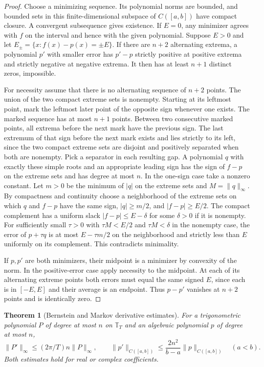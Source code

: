 \documentclass[11pt,oneside,openany]{book}
\newtheorem{theorem}{Theorem}[chapter]
\theoremstyle{definition}
\theoremstyle{remark}
\begin{document}
\begin{proof}
Choose a minimizing sequence. Its polynomial norms are bounded,
and bounded sets in this finite-dimensional subspace of $C([a,b])$
have compact closure. A convergent subsequence gives existence.
If $E=0$, any minimizer agrees with $f$ on the interval and hence
with the given polynomial. Suppose $E>0$ and let
$E_\pm=\{x:f(x)-p(x)=\pm E\}$. If there are $n+2$ alternating
extrema, a polynomial $p'$ with smaller error has $p'-p$ strictly
positive at positive extrema and strictly negative at negative
extrema. It then has at least $n+1$ distinct zeros, impossible.

For necessity assume that there is no alternating sequence of
$n+2$ points. The union of the two compact extreme sets is nonempty.
Starting at its leftmost point, mark the leftmost later point of
the opposite sign whenever one exists. The marked sequence has
at most $n+1$ points. Between two consecutive marked points, all
extrema before the next mark have the previous sign. The last
extremum of that sign before the next mark exists and lies strictly
to its left, since the two compact extreme sets are disjoint and
positively separated when both are nonempty. Pick a separator in
each resulting gap. A polynomial $q$ with exactly these simple
roots and an appropriate leading sign has the sign of $f-p$ on
the extreme sets and has degree at most $n$. In the one-sign
case take a nonzero constant. Let $m>0$ be the minimum of $|q|$
on the extreme sets and $M=\|q\|_\infty$. By compactness and
continuity choose a neighborhood of the extreme sets on which
$q$ and $f-p$ have the same sign, $|q|\ge m/2$, and
$|f-p|\ge E/2$. The compact complement has a uniform slack
$|f-p|\le E-\delta$ for some $\delta>0$ if it is nonempty.
For sufficiently small $\tau>0$ with $\tau M<E/2$ and
$\tau M<\delta$ in the nonempty case, the error of $p+\tau q$
is at most $E-\tau m/2$ on the neighborhood and strictly less than
$E$ uniformly on its complement. This contradicts minimality.

If $p,p'$ are both minimizers, their midpoint is a minimizer by
convexity of the norm. In the positive-error case apply necessity
to the midpoint. At each of its alternating extreme points both
errors must equal the same signed $E$, since each is in $[-E,E]$
and their average is an endpoint. Thus $p-p'$ vanishes at $n+2$
points and is identically zero.
\end{proof}

\begin{theorem}[Bernstein and Markov derivative estimates]
\label{p102:U1-07}
For a trigonometric polynomial $P$ of degree at most $n$ on
$\mathbb T_T$ and an algebraic polynomial $p$ of degree at most $n$,
\[
 \|P'\|_\infty\le (2\pi/T)n\|P\|_\infty,\qquad
 \|p'\|_{C([a,b])}\le \frac{2n^2}{b-a}\|p\|_{C([a,b])}\quad(a<b).
\]
Both estimates hold for real or complex coefficients.
\end{theorem}
\end{document}
